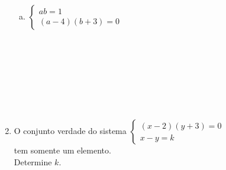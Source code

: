 \documentclass[a4paper,14pt]{article}
\begin{document}
\begin{multicols}{2}
\begin{enumerate}
\begin{enumerate}[a)]
            	\item $\begin{cases}
            		ab = 1 \\
            		(a - 4)(b + 3) = 0
            	\end{cases}$ \\\\\\\\\\\\\\\\
		    \end{enumerate}
	    	\item O conjunto verdade do sistema $\begin{cases}
	    		(x - 2)(y + 3) = 0 \\
	    		x - y = k
	    	\end{cases}$ \\tem somente um elemento. \\Determine $k$.
		\end{enumerate}

\end{multicols}
\end{document}
